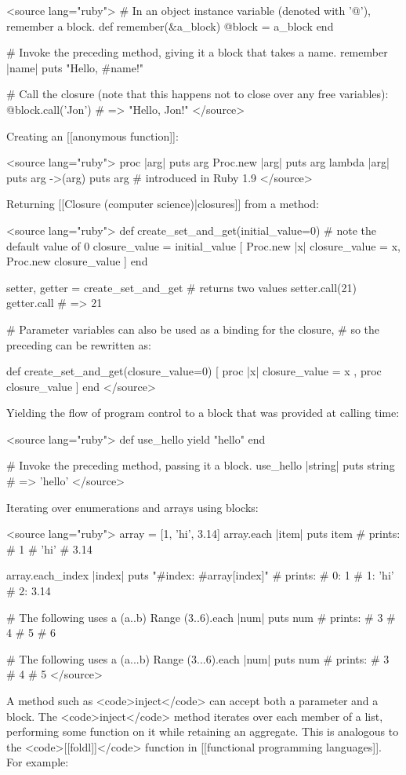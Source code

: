 <source lang="ruby">
# In an object instance variable (denoted with '@'), remember a block.
def remember(&a_block)
  @block = a_block
end

# Invoke the preceding method, giving it a block that takes a name.
remember {|name| puts "Hello, #{name}!"}

# Call the closure (note that this happens not to close over any free variables):
@block.call('Jon')   # => "Hello, Jon!"
</source>

Creating an [[anonymous function]]:

<source lang="ruby">
proc {|arg| puts arg}
Proc.new {|arg| puts arg}
lambda {|arg| puts arg}
->(arg) {puts arg}         # introduced in Ruby 1.9
</source>

Returning [[Closure (computer science)|closures]] from a method:

<source lang="ruby">
def create_set_and_get(initial_value=0) # note the default value of 0
  closure_value = initial_value
  [ Proc.new {|x| closure_value = x}, Proc.new { closure_value } ]
end

setter, getter = create_set_and_get  # returns two values
setter.call(21)
getter.call      # => 21

# Parameter variables can also be used as a binding for the closure,
# so the preceding can be rewritten as:

def create_set_and_get(closure_value=0)
  [ proc {|x| closure_value = x } , proc { closure_value } ]
end
</source>

Yielding the flow of program control to a block that was provided at calling time:

<source lang="ruby">
def use_hello
  yield "hello"
end

# Invoke the preceding method, passing it a block.
use_hello {|string| puts string}  # => 'hello'
</source>

Iterating over enumerations and arrays using blocks:

<source lang="ruby">
array = [1, 'hi', 3.14]
array.each {|item| puts item }
# prints:
# 1
# 'hi'
# 3.14

array.each_index {|index| puts "#{index}: #{array[index]}" }
# prints:
# 0: 1
# 1: 'hi'
# 2: 3.14

# The following uses a (a..b) Range
(3..6).each {|num| puts num }
# prints:
# 3
# 4
# 5
# 6

# The following uses a (a...b) Range
(3...6).each {|num| puts num }
# prints:
# 3
# 4
# 5
</source>

A method such as <code>inject</code> can accept both a parameter and a block. The <code>inject</code> method iterates over each member of a list, performing some function on it while retaining an aggregate. This is analogous to the <code>[[foldl]]</code> function in [[functional programming languages]]. For example:

